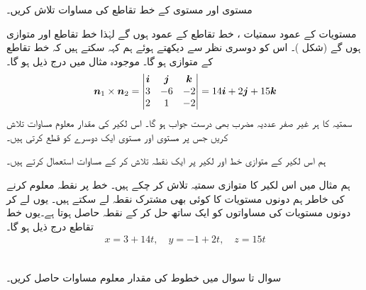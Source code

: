 مستوی  اور مستوی  کے خط تقاطع کی مساوات تلاش کریں۔

مستویات کے عمود سمتیات ،      خط تقاطع کے  عمود  ہوں  گے  لہٰذا خط تقاطع
 اور     متوازی ہوں  گے (شکل )۔ اس کو دوسری نظر سے دیکھتے ہوئے ہم کہہ سکتے ہیں کہ   خط تقاطع کے متوازی ہو گا۔ موجودہ مثال میں درج ذیل ہو گا۔
\begin{align*}
{\ensuremath{{\boldsymbol{n}}}}_1\times{\ensuremath{{\boldsymbol{n}}}}_2=\begin{vmatrix}{\boldsymbol{i}}&{\boldsymbol{j}}&{\boldsymbol{k}}\\3&-6&-2\\2&1&-2\end{vmatrix}=14{\boldsymbol{i}}+2{\boldsymbol{j}}+15{\boldsymbol{k}}
\end{align*}
سمتیہ  کا ہر غیر صفر عددیہ مضرب بھی درست جواب ہو گا۔
اس لکیر کی  مقدار معلوم مساوات تلاش کریں جس پر مستوی  اور مستوی  ایک دوسرے کو قطع کرتی ہیں۔

ہم اس لکیر کے متوازی خط  اور  لکیر پر ایک نقطہ  تلاش کر کے   مساوات  استعمال کرتے ہیں۔

ہم مثال  میں  اس لکیر کا متوازی سمتیہ   تلاش کر چکے ہیں۔ خط پر نقطہ معلوم کرنے کی خاطر  ہم دونوں مستویات  کا  کوئی بھی مشترک نقطہ لے سکتے ہیں۔ یوں  لے کر دونوں مستویات  کی مساواتوں کو ایک ساتھ حل کر کے نقطہ  حاصل ہوتا ہے۔یوں خط تقاطع درج ذیل ہو گا۔
\begin{align*}
x=3+14t,\quad y=-1+2t,\quad z=15t
\end{align*}

\\
سوال  تا  سوال    میں خطوط کی مقدار معلوم مساوات حاصل کریں۔

